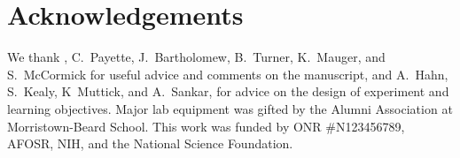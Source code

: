\documentclass[aps,prl,preprint]{revtex4-1}
\begin{document}

\section{Acknowledgements}
We thank , C.~Payette, J.~Bartholomew, B.~Turner, K.~Mauger, and S.~McCormick for useful advice and comments on the manuscript, and A.~Hahn, S.~Kealy, K~Muttick, and A.~Sankar, for advice on the design of experiment and learning objectives. Major lab equipment was gifted by the Alumni Association at Morristown-Beard School. This work was funded by ONR \#N123456789, AFOSR, NIH, and the National Science Foundation. 

\end{document}
